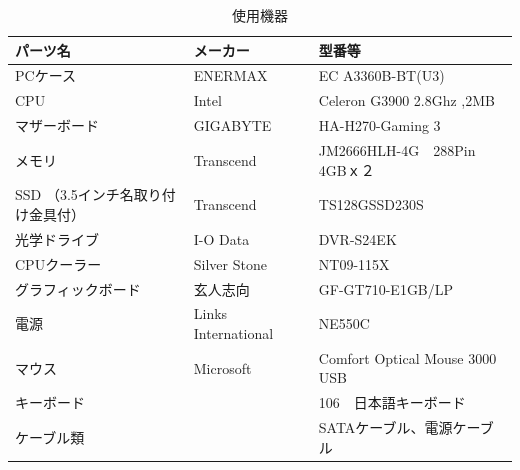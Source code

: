 \documentclass[10pt]{article}
\begin{document}
	\begin{table}[H]
	    \centering
		\caption{使用機器}
		\begin{tabular}{|l|l|l|}
			
			\hline
			パーツ名 & メーカー & 型番等 \\ [0.5ex] 
			\hline\hline
			PCケース                & ENERMAX             & EC A3360B-BT(U3)               \\ \hline
			CPU                  & Intel               & Celeron G3900 2.8Ghz ,2MB      \\ \hline
			マザーボード               & GIGABYTE            & HA-H270-Gaming 3               \\ \hline
			メモリ                  & Transcend           & JM2666HLH-4G　288Pin　4GBｘ２      \\ \hline
			SSD （3.5インチ名取り付け金具付） & Transcend           & TS128GSSD230S                  \\ \hline
			光学ドライブ               & I-O Data            & DVR-S24EK                      \\ \hline
			CPUクーラー              & Silver Stone        & NT09-115X                      \\ \hline
			グラフィックボード            & 玄人志向                & GF-GT710-E1GB/LP               \\ \hline
			電源                   & Links　International & NE550C                         \\ \hline
			マウス                  & Microsoft           & Comfort Optical Mouse 3000 USB \\ \hline
			キーボード                &                     & 106　日本語キーボード                   \\ \hline
			ケーブル類                &                     & SATAケーブル、電源ケーブル                \\ \hline
		\end{tabular}
	\end{table}
	\endgroup
	\pagebreak
	
\end{document}
